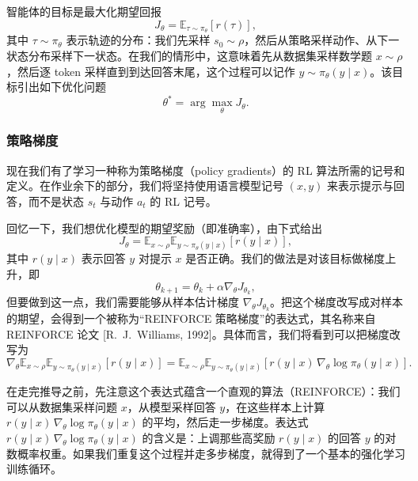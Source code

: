 智能体的目标是最大化期望回报
\begin{equation}
J_\theta = \mathbb{E}_{\tau\sim\pi_\theta}[r(\tau)],
\end{equation}
其中 $\tau\sim\pi_\theta$ 表示轨迹的分布：我们先采样 $s_0 \sim \rho$，然后从策略采样动作、从下一状态分布采样下一状态。在我们的情形中，这意味着先从数据集采样数学题 $x \sim \rho$，然后逐 token 采样直到到达回答末尾，这个过程可以记作 $y \sim \pi_\theta(y \mid x)$。该目标引出如下优化问题
\begin{equation}
\theta^* = \arg\max_\theta J_\theta.
\end{equation}

\subsubsection{策略梯度}

现在我们有了学习一种称为策略梯度（policy gradients）的 RL 算法所需的记号和定义。在作业余下的部分，我们将坚持使用语言模型记号 $(x, y)$ 来表示提示与回答，而不是状态 $s_t$ 与动作 $a_t$ 的 RL 记号。

回忆一下，我们想优化模型的期望奖励（即准确率），由下式给出
\begin{equation}
J_\theta = \mathbb{E}_{x\sim\rho}\mathbb{E}_{y\sim\pi_\theta(y \mid x)}[r(y \mid x)],
\end{equation}
其中 $r(y \mid x)$ 表示回答 $y$ 对提示 $x$ 是否正确。我们的做法是对该目标做梯度上升，即
\begin{equation}
\theta_{k+1} = \theta_k + \alpha \nabla_\theta J_{\theta_k},
\end{equation}
但要做到这一点，我们需要能够从样本估计梯度 $\nabla_\theta J_{\theta_k}$。把这个梯度改写成对样本的期望，会得到一个被称为“REINFORCE 策略梯度”的表达式，其名称来自 REINFORCE 论文 [R.\ J.\ Williams, 1992]。具体而言，我们将看到可以把梯度改写为
\begin{equation}
\nabla_\theta \mathbb{E}_{x\sim\rho}\mathbb{E}_{y\sim\pi_\theta(y \mid x)}[r(y \mid x)] = \mathbb{E}_{x\sim\rho}\mathbb{E}_{y\sim\pi_\theta(y \mid x)}[r(y \mid x)\, \nabla_\theta \log \pi_\theta(y \mid x)].
\end{equation}

在走完推导之前，先注意这个表达式蕴含一个直观的算法（REINFORCE）：我们可以从数据集采样问题 $x$，从模型采样回答 $y$，在这些样本上计算 $r(y \mid x)\,\nabla_\theta \log \pi_\theta(y \mid x)$ 的平均，然后走一步梯度。表达式 $r(y \mid x)\,\nabla_\theta \log \pi_\theta(y \mid x)$ 的含义是：上调那些高奖励 $r(y \mid x)$ 的回答 $y$ 的对数概率权重。如果我们重复这个过程并走多步梯度，就得到了一个基本的强化学习训练循环。

